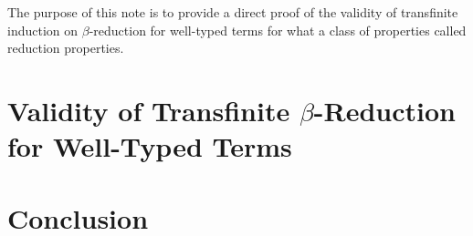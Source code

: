 \documentclass[11pt,twoside]{article}
\begin{document}
The purpose of this note is to provide a direct proof of the validity of transfinite
induction on $\beta$-reduction for well-typed terms for what a class of properties called
reduction properties.

\section{Validity of Transfinite $\beta$-Reduction for Well-Typed Terms}




\section{Conclusion}



\end{document}
